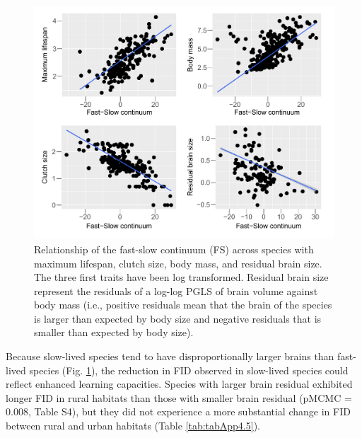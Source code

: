 \begin{figure}
\centering
\includegraphics[width=\textwidth]{./Figures/chapter04/Fig_3.png}
\caption[Fast-slow continuum and LH traits]{Relationship of the fast-slow continuum (FS) across species with maximum lifespan,
clutch size, body mass, and residual brain size. The three first
traits have been log transformed. Residual brain size represent the
residuals of a log-log PGLS of brain volume against body mass
(i.e., positive residuals mean that the brain of the species is larger
than expected by body size and negative residuals that is smaller
than expected by body size).}\label{fig:fig4.3}
\end{figure}

Because slow-lived species tend to have disproportionally
larger brains than fast-lived species (Fig. \ref{fig:fig4.3}), the reduction in
FID observed in slow-lived species could reflect enhanced learning 
capacities. Species with larger brain residual exhibited longer
FID in rural habitats than those with smaller brain residual
(pMCMC = 0.008, Table S4), but they did not experience a more
substantial change in FID between rural and urban habitats
(Table \ref{tab:tabApp4.5}).


